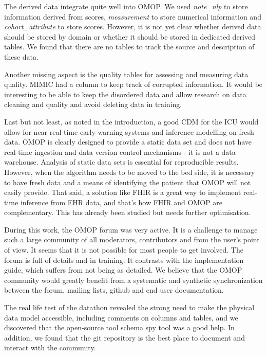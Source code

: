 The derived data integrate quite well into OMOP. We used \textit{note\_nlp} to
store information derived from scores, \textit{measurement} to store numerical
information and \textit{cohort\_attribute} to store scores. However, it is not
yet clear whether derived data should be stored by domain or whether it should
be stored in dedicated derived tables. We found that there are no tables to
track the source and description of these data. 


Another missing aspect is the quality tables for assessing and measuring data 
quality. MIMIC had a column to keep track of corrupted information. 
It would be interesting to be able to keep the disordered data and allow 
research on data cleaning and quality and avoid deleting data in training.

Last but not least, as noted in the introduction, a good CDM for the ICU would 
allow for near real-time early warning systems and inference modelling on fresh 
data. OMOP is clearly designed to provide a static data set and does not have 
real-time ingestion and data version control mechanisms - it is not a data 
warehouse. Analysis of static data sets is essential for reproducible results. 
However, when the algorithm needs to be moved to the bed side, it is necessary 
to have fresh data and a means of identifying the patient that OMOP will not 
easily provide. That said, a solution like FHIR is a great way to implement 
real-time inference from EHR data, and that's how FHIR and OMOP are complementary. 
This has already been studied \cite{gatech}  but needs further optimisation.

During this work, the OMOP forum was very active. It is a challenge to manage 
such a large community of all moderators, contributors and from the user's 
point of view. It seems that it is not possible for most people to get involved. 
The forum is full of details and in training. It contrasts with the implementation 
guide, which suffers from not being as detailed. We believe that the OMOP 
community would greatly benefit from a systematic and synthetic synchronization 
between the forum, mailing lists, github and end user documentation.


The real life test of the datathon revealed the strong need to make the physical 
data model accessible, including comments on columns and tables, and we 
discovered that the open-source tool schema spy tool was a good help. 
In addition, we found that the git repository is the best place to document 
and interact with the community.

